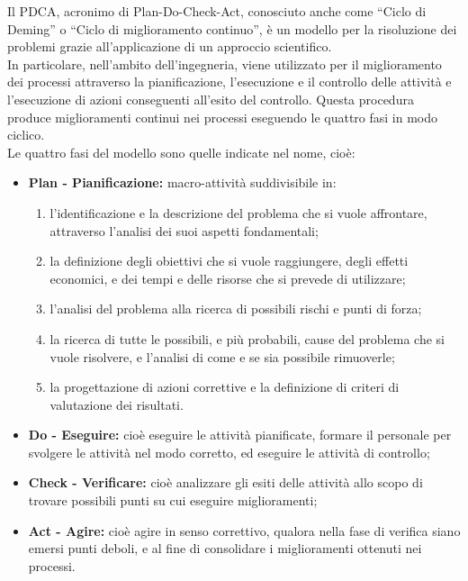 
 \label{app:pdca}
Il PDCA, acronimo di Plan-Do-Check-Act, conosciuto anche come “Ciclo di Deming” o “Ciclo di miglioramento continuo”, è un modello per la risoluzione dei problemi grazie all'applicazione di un approccio scientifico.\\
In particolare, nell'ambito dell'ingegneria, viene utilizzato per il miglioramento dei processi attraverso la pianificazione, l'esecuzione e il controllo delle attività e l'esecuzione di azioni conseguenti all'esito del controllo. Questa procedura produce miglioramenti continui nei processi eseguendo le quattro fasi in modo ciclico.\\
Le quattro fasi del modello sono quelle indicate nel nome, cioè:
\begin{itemize}
	\item \textbf{Plan - Pianificazione:} macro-attività suddivisibile in:
		\begin{enumerate}
		\item l'identificazione e la descrizione del problema che si vuole affrontare, attraverso l'analisi dei suoi aspetti fondamentali;
		\item la definizione degli obiettivi che si vuole raggiungere, degli effetti economici, e dei tempi e delle risorse che si prevede di utilizzare;
		\item l'analisi del problema alla ricerca di possibili rischi e punti di forza;
		\item la ricerca di tutte le possibili, e più probabili, cause del problema che si vuole risolvere, e l'analisi di come e se sia possibile rimuoverle;
		\item la progettazione di azioni correttive e la definizione di criteri di valutazione dei risultati.
		\end{enumerate}
	\item \textbf{Do - Eseguire:} cioè eseguire le attività pianificate, formare il personale per svolgere le attività nel modo corretto, ed eseguire le attività di controllo;
	\item \textbf{Check - Verificare:} cioè analizzare gli esiti delle attività allo scopo di trovare possibili punti su cui eseguire miglioramenti;
	\item \textbf{Act - Agire:} cioè agire in senso correttivo, qualora nella fase di verifica siano emersi punti deboli, e al fine di consolidare i miglioramenti ottenuti nei processi.
\end{itemize}

